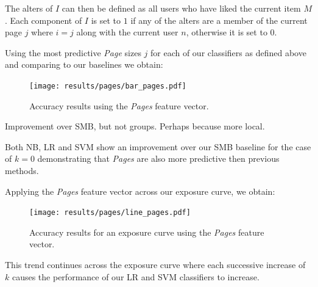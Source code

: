 The alters of $I$ can then be defined as all users who have liked the current item $M$.
Each component of $I$ is set to $1$ if any of the alters are a member of the current page $j$ where $i = j$ along with the 
current user $n$, otherwise it is set to $0$.

\clearpage

Using the most predictive \emph{Page} sizes $j$ for each of our classifiers as defined above and comparing to our baselines we obtain:

\begin{figure}[h]
	\begin{center}
		\texttt{[image: results/pages/bar\_pages.pdf]}
		\caption{Accuracy results using the \emph{Pages} feature vector.}
	\end{center}
\end{figure}

Improvement over SMB, but not groups. Perhaps because more local.

Both NB, LR and SVM show an improvement over our SMB baseline for the case of $k = 0$ demonstrating that \emph{Pages} are also 
more predictive then previous methods.

\clearpage

Applying the \emph{Pages} feature vector across our exposure curve, we obtain:

\begin{figure}[h]
	\begin{center}
		\texttt{[image: results/pages/line\_pages.pdf]}
		\caption{Accuracy results for an exposure curve using the \emph{Pages} feature vector.}
	\end{center}
\end{figure}

This trend continues across the exposure curve where each successive increase of $k$ causes the performance of our LR and SVM classifiers to 
increase.

\clearpage

